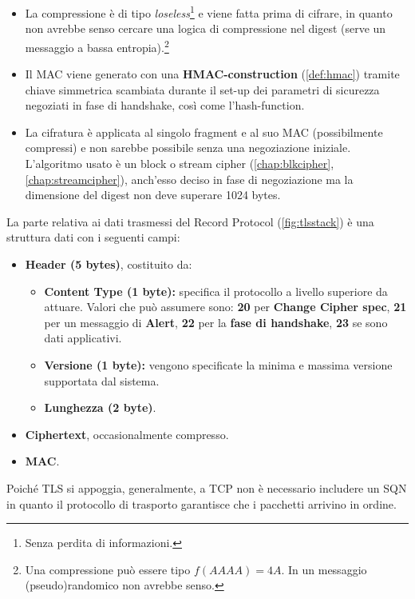 \begin{itemize}
    \item La compressione è di tipo \textit{loseless}\footnote{Senza perdita di informazioni.} e viene fatta prima di cifrare, in quanto non avrebbe senso cercare una logica di compressione nel digest (serve un messaggio a bassa entropia).\footnote{Una compressione può essere tipo $f(AAAA) = 4A$. In un messaggio (pseudo)randomico non avrebbe senso.}
    \item Il MAC viene generato con una \textbf{HMAC-construction} (\cref{def:hmac}) tramite chiave simmetrica scambiata durante il set-up dei parametri di sicurezza negoziati in fase di handshake, così come l'hash-function.
    \item La cifratura è applicata al singolo fragment e al suo MAC (possibilmente compressi) e non sarebbe possibile senza una negoziazione iniziale. L'algoritmo usato è un block o stream cipher (\cref{chap:blkcipher}, \cref{chap:streamcipher}), anch'esso deciso in fase di negoziazione ma la dimensione del digest non deve superare 1024 bytes.
\end{itemize}
La parte relativa ai dati trasmessi del Record Protocol (\cref{fig:tlsstack}) è una struttura dati con i seguenti campi:
\begin{definition}
\begin{itemize}
    \item \textbf{Header (5 bytes)}, costituito da:
    \begin{itemize}
        \item \textbf{Content Type (1 byte):} specifica il protocollo a livello superiore da attuare. Valori che può assumere sono: \textbf{20} per \textbf{Change Cipher spec}, \textbf{21} per un messaggio di \textbf{Alert}, \textbf{22} per la \textbf{fase di handshake}, \textbf{23} se sono dati applicativi.
        \item \textbf{Versione (1 byte):} vengono specificate la minima e massima versione supportata dal sistema. 
        \item \textbf{Lunghezza (2 byte)}.
    \end{itemize}
    \item \textbf{Ciphertext}, occasionalmente compresso.
    \item \textbf{MAC}.
\end{itemize}
\begin{remark}
Poiché TLS si appoggia, generalmente, a TCP non è necessario includere un SQN in quanto il protocollo di trasporto garantisce che i pacchetti arrivino in ordine.
\end{remark}
\end{definition}

